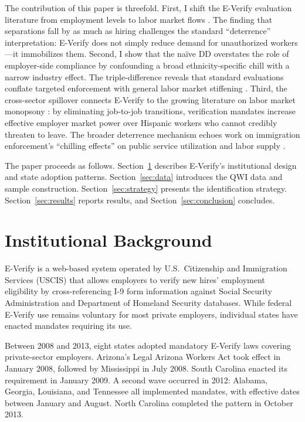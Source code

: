 \documentclass[12pt]{article}
\begin{document}
The contribution of this paper is threefold. First, I shift the E-Verify evaluation literature from employment levels to labor market flows \citep{east2023labor}. The finding that separations fall by as much as hiring challenges the standard ``deterrence'' interpretation: E-Verify does not simply reduce demand for unauthorized workers---it immobilizes them. Second, I show that the naïve DD overstates the role of employer-side compliance by confounding a broad ethnicity-specific chill with a narrow industry effect. The triple-difference reveals that standard evaluations conflate targeted enforcement with general labor market stiffening \citep{bohn2014did, good2013mandatory}. Third, the cross-sector spillover connects E-Verify to the growing literature on labor market monopsony \citep{manning2021monopsony, dube2020monopsony, starr2017general}: by eliminating job-to-job transitions, verification mandates increase effective employer market power over Hispanic workers who cannot credibly threaten to leave. The broader deterrence mechanism echoes work on immigration enforcement's ``chilling effects'' on public service utilization \citep{watson2013interior, alsan2019fear} and labor supply \citep{chassamboulli2015effects, clemens2018immigration}.

The paper proceeds as follows. Section~\ref{sec:background} describes E-Verify's institutional design and state adoption patterns. Section~\ref{sec:data} introduces the QWI data and sample construction. Section~\ref{sec:strategy} presents the identification strategy. Section~\ref{sec:results} reports results, and Section~\ref{sec:conclusion} concludes.

\section{Institutional Background}
\label{sec:background}

E-Verify is a web-based system operated by U.S.\ Citizenship and Immigration Services (USCIS) that allows employers to verify new hires' employment eligibility by cross-referencing I-9 form information against Social Security Administration and Department of Homeland Security databases. While federal E-Verify use remains voluntary for most private employers, individual states have enacted mandates requiring its use.

Between 2008 and 2013, eight states adopted mandatory E-Verify laws covering private-sector employers. Arizona's Legal Arizona Workers Act took effect in January 2008, followed by Mississippi in July 2008. South Carolina enacted its requirement in January 2009. A second wave occurred in 2012: Alabama, Georgia, Louisiana, and Tennessee all implemented mandates, with effective dates between January and August. North Carolina completed the pattern in October 2013.
\end{document}

